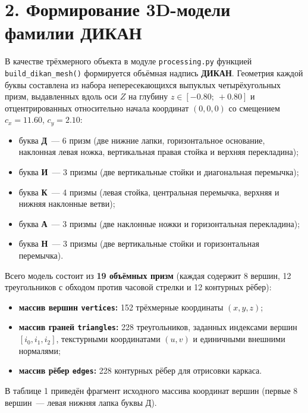 \documentclass[11pt,a4paper]{article}
\begin{document}
\section*{2. Формирование 3D-модели фамилии ДИКАН}
В качестве трёхмерного объекта в модуле \texttt{processing.py} функцией \texttt{build\_dikan\_mesh()} формируется объёмная надпись \textbf{ДИКАН}. Геометрия каждой буквы составлена из набора непересекающихся выпуклых четырёхугольных призм, выдавленных вдоль оси $Z$ на глубину $z \in [-0.80;\ +0.80]$ и отцентрированных относительно начала координат $(0, 0, 0)$ со смещением $c_x = 11.60$, $c_y = 2.10$:
\begin{itemize}
    \item буква \textbf{Д}~--- 6 призм (две нижние лапки, горизонтальное основание, наклонная левая ножка, вертикальная правая стойка и верхняя перекладина);
    \item буква \textbf{И}~--- 3 призмы (две вертикальные стойки и диагональная перемычка);
    \item буква \textbf{К}~--- 4 призмы (левая стойка, центральная перемычка, верхняя и нижняя наклонные ветви);
    \item буква \textbf{А}~--- 3 призмы (две наклонные ножки и горизонтальная перекладина);
    \item буква \textbf{Н}~--- 3 призмы (две вертикальные стойки и горизонтальная перемычка).
\end{itemize}

Всего модель состоит из \textbf{19 объёмных призм} (каждая содержит 8 вершин, 12 треугольников с обходом против часовой стрелки и 12 контурных рёбер):
\begin{itemize}
    \item \textbf{массив вершин \texttt{vertices}:} 152 трёхмерные координаты $(x, y, z)$;
    \item \textbf{массив граней \texttt{triangles}:} 228 треугольников, заданных индексами вершин $[i_0, i_1, i_2]$, текстурными координатами $(u, v)$ и единичными внешними нормалями;
    \item \textbf{массив рёбер \texttt{edges}:} 228 контурных рёбер для отрисовки каркаса.
\end{itemize}

В таблице 1 приведён фрагмент исходного массива координат вершин (первые 8 вершин~--- левая нижняя лапка буквы Д).
\end{document}

